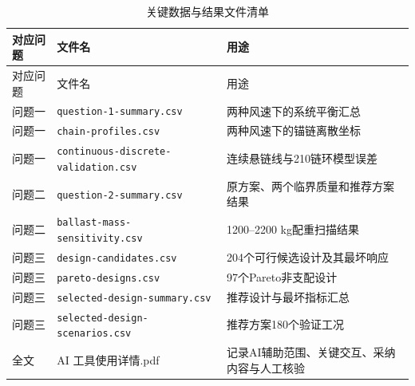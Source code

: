 \documentclass[UTF8,zihao=-4,a4paper,fontset=fandol]{ctexart}
\begin{document}
\begin{longtable}{L{0.12\textwidth}L{0.34\textwidth}L{0.42\textwidth}}
\caption{关键数据与结果文件清单}\label{tab:appendix-data}\\
\toprule 对应问题 & 文件名 & 用途\\ \midrule
\endfirsthead
\toprule 对应问题 & 文件名 & 用途\\ \midrule
\endhead
问题一 & \texttt{question-1-summary.csv} & 两种风速下的系统平衡汇总\\
问题一 & \texttt{chain-profiles.csv} & 两种风速下的锚链离散坐标\\
问题一 & \texttt{continuous-discrete-validation.csv} & 连续悬链线与210链环模型误差\\
问题二 & \texttt{question-2-summary.csv} & 原方案、两个临界质量和推荐方案结果\\
问题二 & \texttt{ballast-mass-sensitivity.csv} & 1200--2200 kg配重扫描结果\\
问题三 & \texttt{design-candidates.csv} & 204个可行候选设计及其最坏响应\\
问题三 & \texttt{pareto-designs.csv} & 97个Pareto非支配设计\\
问题三 & \texttt{selected-design-summary.csv} & 推荐设计与最坏指标汇总\\
问题三 & \texttt{selected-design-scenarios.csv} & 推荐方案180个验证工况\\
全文 & AI 工具使用详情.pdf & 记录AI辅助范围、关键交互、采纳内容与人工核验\\
\bottomrule
\end{longtable}
\endgroup
\end{document}
